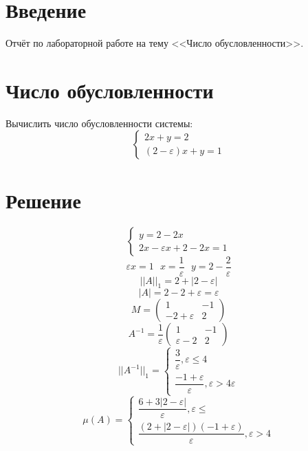 \documentclass[14pt, titlepage,fleqn]{extarticle}
\begin{document}
	

	
	
	\newpage
	
	\tableofcontents   
	\clearpage
	\section*{Введение}
	Отчёт по лабораторной работе на тему <<Число обусловленности>>.	
	\newpage









	\section*{Число обусловленности}
	Вычислить число обусловленности системы:
	\[\begin{cases}
		2x + y = 2\\
		(2-\varepsilon)x+y=1
	\end{cases}\]
	\section*{Решение}
	\[\begin{cases}
		y = 2- 2x\\
		2x- \varepsilon x + 2 -2x = 1
	\end{cases}\]
\[\varepsilon x = 1~~~ x = \dfrac{1}{\varepsilon}~~~y = 2 - \dfrac{2}{\varepsilon}\]
	\[||A||_1 = 2 + |2-\varepsilon|\]
	\[|A| = 2 -2 + \varepsilon = \varepsilon\]
	\[M = \begin{pmatrix}
		1 & -1\\
		-2+\varepsilon & 2
	\end{pmatrix}\]
	\[A^{-1} = \dfrac{1}{\varepsilon}\begin{pmatrix}
		1 & -1\\
		\varepsilon - 2 & 2
	\end{pmatrix}\]
	\[||A^{-1}||_1 = \begin{cases}
		\dfrac{3}{\varepsilon}, \varepsilon \leq 4\\
		\dfrac{-1 + \varepsilon}{\varepsilon}, \varepsilon > 4\varepsilon 
	\end{cases}\]
	\[\mu (A) = \begin{cases}
		\dfrac{6+3|2-\varepsilon|}{\varepsilon}, \varepsilon \leq \\
		\dfrac{(2+|2-\varepsilon|)(-1+\varepsilon)}{\varepsilon}, \varepsilon>4
	\end{cases}\]
\end{document}
